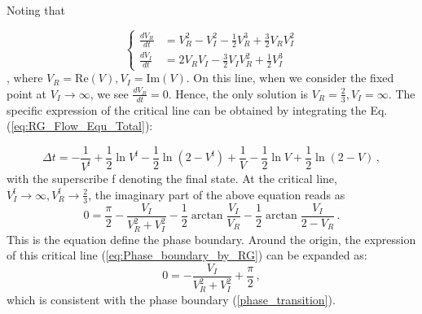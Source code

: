 \documentclass[aps,onecolumn,nofootinbib,superscriptaddress,notitlepage,longbibliography]{revtex4-1}
\begin{document}
Noting that

\begin{equation}
\begin{cases}
\frac{dV_{R}}{dt} & =V_{R}^{2}-V_{I}^{2}-\frac{1}{2}V_{R}^{3}+\frac{3}{2}V_{R}V_{I}^{2}\\
\frac{dV_{I}}{dt} & =2V_{R}V_{I}-\frac{3}{2}V_{I}V_{R}^{2}+\frac{1}{2}V_{I}^{3}
\end{cases}
\end{equation}
, where $V_{R}=\mathrm{Re}(V),V_{I}=\mathrm{Im}(V)$. On this line,
when we consider the fixed point at $V_{I}\rightarrow\infty$, we
see $\frac{dV_{R}}{dt}=0$. Hence, the only solution is $V_{R}=\frac{2}{3},V_{I}=\infty$.
The specific expression of the critical line can be obtained by integrating
the Eq. (\ref{eq:RG_Flow_Equ_Total}):

\begin{equation}
\Delta t=-\frac{1}{V^{\mathrm{f}}}+\frac{1}{2}\ln V^{\mathrm{f}}-\frac{1}{2}\ln(2-V^{\mathrm{f}})+\frac{1}{V}-\frac{1}{2}\ln V+\frac{1}{2}\ln(2-V)\,,\label{eq:Relation_between_t_and_U}
\end{equation}
with the superscribe f denoting the final state. At the critical line,
$V_{I}^{\mathrm{f}}\to\infty,V_{R}^{\mathrm{f}}\to\frac{2}{3}$, the
imaginary part of the above equation reads as 
\begin{equation}
0=\frac{\pi}{2}-\frac{V_{I}}{V_{R}^{2}+V_{I}^{2}}-\frac{1}{2}\arctan\frac{V_{I}}{V_{R}}-\frac{1}{2}\arctan\frac{V_{I}}{2-V_{R}}\,.\label{eq:Phase_boundary_by_RG}
\end{equation}
This is the equation define the phase boundary. Around the origin,
the expression of this critical line (\ref{eq:Phase_boundary_by_RG})
can be expanded as: 
\begin{equation}
0=-\frac{V_{I}}{V_{R}^{2}+V_{I}^{2}}+\frac{\pi}{2}\,,
\end{equation}
which is consistent with the phase boundary (\ref{phase_transition}).
\end{document}

